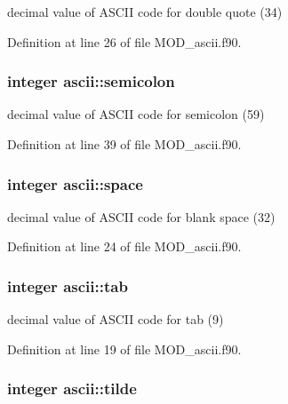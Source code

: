 decimal value of A\-S\-C\-I\-I code for double quote (34) 



Definition at line 26 of file M\-O\-D\-\_\-ascii.\-f90.

\hypertarget{classascii_a648866ee03dcdc929278f97f17a9b860}{
\subsubsection[{semicolon}]{\setlength{\rightskip}{0pt plus 5cm}integer ascii\-::semicolon}}\label{classascii_a648866ee03dcdc929278f97f17a9b860}


decimal value of A\-S\-C\-I\-I code for semicolon (59) 



Definition at line 39 of file M\-O\-D\-\_\-ascii.\-f90.

\hypertarget{classascii_a4f20aa36b53614136b85dd2374b762e9}{
\subsubsection[{space}]{\setlength{\rightskip}{0pt plus 5cm}integer ascii\-::space}}\label{classascii_a4f20aa36b53614136b85dd2374b762e9}


decimal value of A\-S\-C\-I\-I code for blank space (32) 



Definition at line 24 of file M\-O\-D\-\_\-ascii.\-f90.

\hypertarget{classascii_a9bbc4e61e092ca87c7b18b4badc5ae59}{
\subsubsection[{tab}]{\setlength{\rightskip}{0pt plus 5cm}integer ascii\-::tab}}\label{classascii_a9bbc4e61e092ca87c7b18b4badc5ae59}


decimal value of A\-S\-C\-I\-I code for tab (9) 



Definition at line 19 of file M\-O\-D\-\_\-ascii.\-f90.

\hypertarget{classascii_adc73c99718708c046c178951df471232}{
\subsubsection[{tilde}]{\setlength{\rightskip}{0pt plus 5cm}integer ascii\-::tilde}}\label{classascii_adc73c99718708c046c178951df471232}



